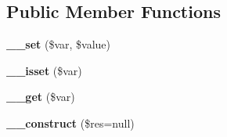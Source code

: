 \subsection*{Public Member Functions}
\begin{DoxyCompactItemize}
\item 
\hypertarget{class_g_e_sym_type_adc13c15a63e582cbd8c17fff350548dd}{{\bfseries \-\_\-\-\_\-set} (\$var, \$value)}\label{class_g_e_sym_type_adc13c15a63e582cbd8c17fff350548dd}

\item 
\hypertarget{class_g_e_sym_type_aedf236026bc31bdf23bd0abb20f159a6}{{\bfseries \-\_\-\-\_\-isset} (\$var)}\label{class_g_e_sym_type_aedf236026bc31bdf23bd0abb20f159a6}

\item 
\hypertarget{class_g_e_sym_type_a8c8fb8022e3e0f035c60b26824accc2e}{{\bfseries \-\_\-\-\_\-get} (\$var)}\label{class_g_e_sym_type_a8c8fb8022e3e0f035c60b26824accc2e}

\item 
\hypertarget{class_g_e_sym_type_ae757d85daea5a76540b8ae63f655f9fc}{{\bfseries \-\_\-\-\_\-construct} (\$res=null)}\label{class_g_e_sym_type_ae757d85daea5a76540b8ae63f655f9fc}

\end{DoxyCompactItemize}
